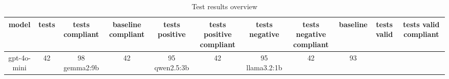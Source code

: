 
  \begin{table}[h!]
  \centering
  \begin{tabular}{|c|c|c|c|c|c|c|c|c|c|c|}
  \hline
  model & tests & tests compliant & baseline compliant & tests positive & tests positive compliant & tests negative & tests negative compliant & baseline & tests valid & tests valid compliant \\
  \hline
  gpt-4o-mini & 42 & 98%
\hline
gemma2:9b & 42 & 95%
\hline
qwen2.5:3b & 42 & 95%
\hline
llama3.2:1b & 42 & 93%
  \end{tabular}
  \caption{Test results overview}
  
  \end{table}
  